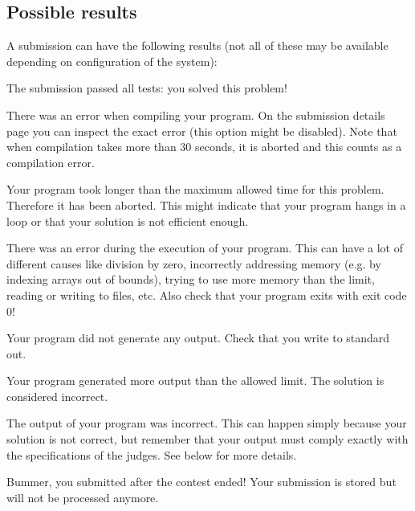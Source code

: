 \documentclass[a4paper,10pt,english,openany]{sphinxmanual}
\begin{document}
\subsection{Possible results}
\label{\detokenize{team:possible-results}}
\sphinxAtStartPar
A submission can have the following results (not all of these may be
available depending on configuration of the system):
\begin{description}
\sphinxAtStartPar
The submission passed all tests: you solved this problem!

\sphinxAtStartPar
There was an error when compiling your program. On the submission
details page you can inspect the exact error (this option might be
disabled).
Note that when compilation takes more than 30 seconds,
it is aborted and this counts as a compilation error.

\sphinxAtStartPar
Your program took longer than the maximum allowed time for this
problem. Therefore it has been aborted. This might indicate that your
program hangs in a loop or that your solution is not efficient
enough.

\sphinxAtStartPar
There was an error during the execution of your program. This can have
a lot of different causes like division by zero, incorrectly
addressing memory (e.g. by indexing arrays out of bounds), trying to
use more memory than the limit, reading or writing to files, etc.
Also check that your program exits with exit code 0!

\sphinxAtStartPar
Your program did not generate any output. Check that you write to
standard out.

\sphinxAtStartPar
Your program generated more output than the allowed limit. The solution
is considered incorrect.

\sphinxAtStartPar
The output of your program was incorrect. This can happen simply
because your solution is not correct, but remember that your output
must comply exactly with the specifications of the judges. See
{\hyperref[\detokenize{team:testing}]{}} below for more details.

\sphinxAtStartPar
Bummer, you submitted after the contest ended! Your submission is
stored but will not be processed anymore.

\end{description}
\end{document}
